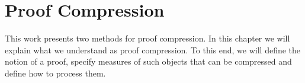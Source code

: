 \chapter*{Proof Compression}

This work presents two methods for proof compression.
In this chapter we will explain what we understand as proof compression.
To this end, we will define the notion of a proof, specify measures of such objects that can be compressed and define how to process them.



